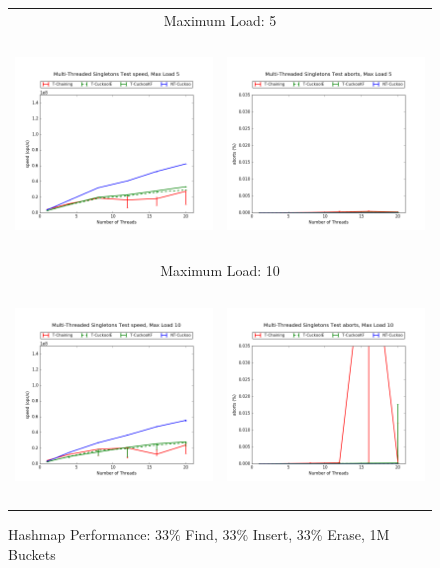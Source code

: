 
\begin{figure}[h!]
    \centering
    \caption{Hashmap Performance: 33\% Find, 33\% Insert, 33\% Erase, 1M Buckets}
    \begin{tabular}{|cc|}
        \hline 
        \multicolumn{2}{|c|}{{\footnotesize Maximum Load: 5}}\\
        \includegraphics[height=2.25in]{maps/5HM1M:F34,I33,E33speed.png} &
        \includegraphics[height=2.25in]{maps/5HM1M:F34,I33,E33aborts.png}\\
        \hline 
        \multicolumn{2}{|c|}{{\footnotesize Maximum Load: 10}}\\
        \includegraphics[height=2.25in]{maps/10HM1M:F34,I33,E33speed.png} &
        \includegraphics[height=2.25in]{maps/10HM1M:F34,I33,E33aborts.png}\\

\end{tabular}
\end{figure}
